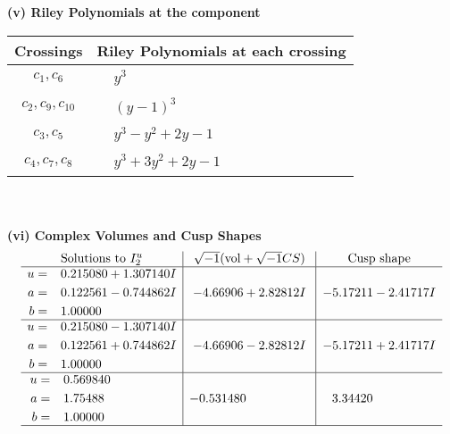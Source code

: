 \documentclass[1p]{elsarticle_modified}
\theoremstyle{definition}
\newcommand{\I}{\sqrt{-1}}
\begin{document}
\flushleft \textbf{(v) Riley Polynomials at the component}\newline \\
\begin{tabular}{m{50pt}|m{274pt}}
Crossings & \hspace{64pt}Riley Polynomials at each crossing \\
\hline $$\begin{aligned}c_{1},c_{6}\end{aligned}$$&$\begin{aligned}
&y^3
\end{aligned}$\\
\hline $$\begin{aligned}c_{2},c_{9},c_{10}\end{aligned}$$&$\begin{aligned}
&(y-1)^3
\end{aligned}$\\
\hline $$\begin{aligned}c_{3},c_{5}\end{aligned}$$&$\begin{aligned}
&y^3- y^2+2 y-1
\end{aligned}$\\
\hline $$\begin{aligned}c_{4},c_{7},c_{8}\end{aligned}$$&$\begin{aligned}
&y^3+3 y^2+2 y-1
\end{aligned}$\\
\hline
\end{tabular}\\~\\
\newpage\flushleft \textbf{(vi) Complex Volumes and Cusp Shapes}
$$\begin{array}{c|c|c}  
\text{Solutions to }I^u_{2}& \I (\text{vol} + \sqrt{-1}CS) & \text{Cusp shape}\\
 \hline 
\begin{aligned}
u &= \phantom{-}0.215080 + 1.307140 I \\
a &= \phantom{-}0.122561 - 0.744862 I \\
b &= \phantom{-}1.00000\phantom{ +0.000000I}\end{aligned}
 & -4.66906 + 2.82812 I & -5.17211 - 2.41717 I \\ \hline\begin{aligned}
u &= \phantom{-}0.215080 - 1.307140 I \\
a &= \phantom{-}0.122561 + 0.744862 I \\
b &= \phantom{-}1.00000\phantom{ +0.000000I}\end{aligned}
 & -4.66906 - 2.82812 I & -5.17211 + 2.41717 I \\ \hline\begin{aligned}
u &= \phantom{-}0.569840\phantom{ +0.000000I} \\
a &= \phantom{-}1.75488\phantom{ +0.000000I} \\
b &= \phantom{-}1.00000\phantom{ +0.000000I}\end{aligned}
 & -0.531480\phantom{ +0.000000I} & \phantom{-}3.34420\phantom{ +0.000000I}\\
 \hline 
 \end{array}$$\newpage
\end{document}
